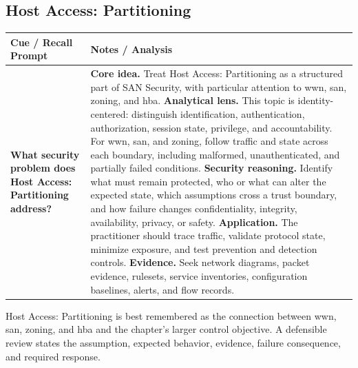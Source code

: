 \documentclass[11pt]{article}
\newcommand{\CornellHeader}{%
\rowcolor{Navy}\color{white}\bfseries Cue / Recall Prompt & \color{white}\bfseries Notes / Analysis\\\hline}
\newcommand{\CornellRow}[2]{%
\cellcolor{CueGray}\RaggedRight\textbf{#1} & \RaggedRight #2\\\hline}
\begin{document}
\subsection*{Host Access: Partitioning}
\begin{longtable}{>{\RaggedRight\arraybackslash}p{}|>{\RaggedRight\arraybackslash}p{}}
\CornellHeader
\CornellRow{What security problem does Host Access: Partitioning address?}{\textbf{Core idea.} Treat Host Access: Partitioning as a structured part of SAN Security, with particular attention to wwn, san, zoning, and hba. \textbf{Analytical lens.} This topic is identity-centered: distinguish identification, authentication, authorization, session state, privilege, and accountability. For wwn, san, and zoning, follow traffic and state across each boundary, including malformed, unauthenticated, and partially failed conditions. \textbf{Security reasoning.} Identify what must remain protected, who or what can alter the expected state, which assumptions cross a trust boundary, and how failure changes confidentiality, integrity, availability, privacy, or safety. \textbf{Application.} The practitioner should trace traffic, validate protocol state, minimize exposure, and test prevention and detection controls. \textbf{Evidence.} Seek network diagrams, packet evidence, rulesets, service inventories, configuration baselines, alerts, and flow records.}
\end{longtable}
\begin{topicsummary}
Host Access: Partitioning is best remembered as the connection between wwn, san, zoning, and hba and the chapter's larger control objective. A defensible review states the assumption, expected behavior, evidence, failure consequence, and required response.
\end{topicsummary}
\end{document}
